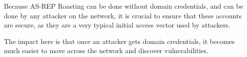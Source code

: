 Because AS-REP Roasting can be done without domain credentials, and can be done by any attacker on the network, it is crucial to ensure that these accounts are secure, as they are a very typical initial access vector used by attackers.

The impact here is that once an attacker gets domain credentials, it becomes much easier to move across the network and discover vulnerabilities. 

